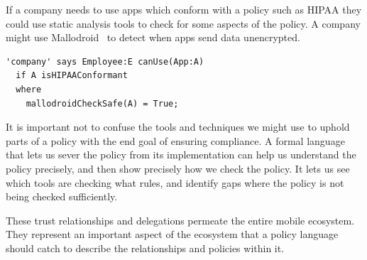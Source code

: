 \documentclass[thesis.tex]{subfiles}
\begin{document}
If a company needs to use apps which conform with a policy such as
\ac{HIPAA} they could use static analysis tools to check for some
aspects of the policy.  A company might use
Mallodroid~\cite{fahl_why_2012} to detect when apps send data unencrypted.  
%
\begin{lstlisting}
'company' says Employee:E canUse(App:A)
  if A isHIPAAConformant
  where
    mallodroidCheckSafe(A) = True;
\end{lstlisting}
%
It is important not to confuse the tools and
techniques we might use to uphold parts of a policy with the end
goal of ensuring compliance.  A formal language that
lets us sever the policy from its implementation can help us
understand the policy precisely, and then show precisely how we check the
policy.  It lets us see which tools are checking what rules, and identify gaps where the policy is not
being checked sufficiently.

These trust relationships and delegations permeate the entire mobile
ecosystem.  They represent an important aspect of the ecosystem that a
policy language should catch to describe the
relationships and policies within it.
\end{document}
